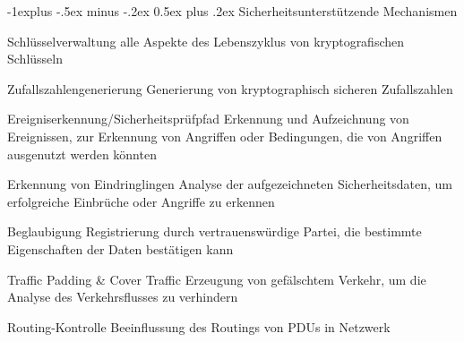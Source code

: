 \documentclass[a4paper]{article}
\makeatletter
\renewcommand{\subsection}{\@startsection{subsection}{2}{0mm}%
 {-1explus -.5ex minus -.2ex}%
 {0.5ex plus .2ex}%
 {\normalfont\normalsize\bfseries}}
\makeatother
\begin{document}
\begin{multicols}{3}
      \subsection{Sicherheitsunterstützende Mechanismen}
      \begin{description*}
            \item[Schlüsselverwaltung] alle Aspekte des Lebenszyklus von kryptografischen Schlüsseln
            \item[Zufallszahlengenerierung] Generierung von kryptographisch sicheren Zufallszahlen
            \item[Ereigniserkennung/Sicherheitsprüfpfad] Erkennung und Aufzeichnung von Ereignissen, zur Erkennung von Angriffen oder Bedingungen, die von Angriffen ausgenutzt werden könnten
            \item[Erkennung von Eindringlingen] Analyse der aufgezeichneten Sicherheitsdaten, um erfolgreiche Einbrüche oder Angriffe zu erkennen
            \item[Beglaubigung] Registrierung durch vertrauenswürdige Partei, die bestimmte Eigenschaften der Daten bestätigen kann
            \item[Traffic Padding \& Cover Traffic] Erzeugung von gefälschtem Verkehr, um die Analyse des Verkehrsflusses zu verhindern
            \item[Routing-Kontrolle] Beeinflussung des Routings von PDUs in Netzwerk
      \end{description*}


\end{multicols}
\end{document}
